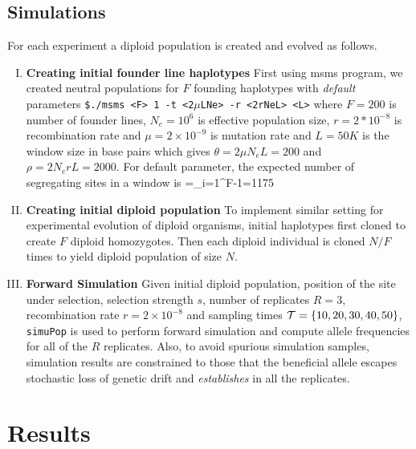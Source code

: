 \documentclass[11pt]{article}
\begin{document}
\subsection{Simulations}
For each experiment a diploid population is created and evolved as 
follows. 
\begin{enumerate}[I.]
	\item {\bf Creating initial founder line haplotypes}
	First using msms program, we created neutral populations for $F$ 
	founding 
	haplotypes with \emph{default} parameters \texttt{\$./msms <F> 1 
	-t 
		<2$\mu$LNe> 
		-r <2rNeL> 
		<L>} 
	where $F=200$ is number of founder lines, $N_e=10^6$ is 
	effective 
	population size, $r=2*10^{-8}$ is recombination rate and 
	$\mu=2\times 
	10^{-9}$ is mutation rate and  $L=50K$ is the window size in 
	base pairs 
	which gives $\theta=2\mu N_eL=200$ and $\rho=2N_erL=2000$. 
	For 
	default 
	parameter, the expected number of segregating sites in a window 
	is 
	\beqq
	\Ebb[M]=\theta \sum_{i=1}^{F-1}=1175
	\eeqq
	\item{\bf Creating initial diploid population} 
	To implement similar setting for experimental evolution of diploid 
	organisms, 
	initial  haplotypes first cloned to create $F$ diploid homozygotes. 
	Then 
	each 
	diploid individual is  cloned $N/F$ times to yield diploid 
	population of 
	size 
	$N$.
	\item{\bf Forward Simulation}
	Given initial diploid population, position of the site under 
	selection, 
	selection 
	strength $s$, number of replicates $R=3$, recombination rate 
	$r=2\times10^{-8}$ 
	and sampling times ${\cal T}=\{10,20,30,40,50\}$, \texttt{simuPop} is 
	used to 
	perform
	forward simulation and  compute allele frequencies for all of the 
	$R$ 
	replicates. Also, to avoid spurious simulation samples, simulation 
	results 
	are constrained to those that the beneficial allele escapes 
	stochastic loss 
	of genetic drift and \emph{establishes} in all the replicates. 
\end{enumerate}









\section{Results}
\end{document}
